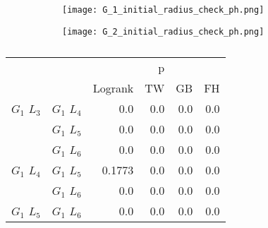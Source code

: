       \begin{figure}
        \centering      
        \begin{subfigure}[b]{0.45\textwidth}
          \texttt{[image: G\_1\_initial\_radius\_check\_ph.png]}
          \caption{}
          \label{fig:g1_branch_radius_check_ph}
        \end{subfigure}
        \hfill
        \begin{subfigure}[b]{0.45\textwidth}
          \texttt{[image: G\_2\_initial\_radius\_check\_ph.png]}
          \caption{}
          \label{fig:g2_branch_radius_check_ph}
        \end{subfigure}
        \caption{}
        \label{fig:branch_radius_check_ph}
      \end{figure}

      

      
      
      \begin{table}
        \centering
        \begin{tabular}{llrrrr}
          \toprule
                       &             &         &  p &    &     \\
          \cmidrule{3-6}
                       &             & Logrank & TW & GB & FH  \\
          \midrule
          $G_1$ $L_3$  & $G_1$ $L_4$  &  0.0 &  0.0 &  0.0 &  0.0     \\
                       & $G_1$ $L_5$  & 0.0 & 0.0 & 0.0 & 0.0    \\
                       & $G_1$ $L_6$  & 0.0 & 0.0 & 0.0 & 0.0      \\
          $G_1$ $L_4$  & $G_1$ $L_5$  & 0.1773 & 0.0 & 0.0 & 0.0      \\
                       & $G_1$ $L_6$  & 0.0 & 0.0 & 0.0 & 0.0       \\
          $G_1$ $L_5$   & $G_1$ $L_6$ & 0.0 &  0.0 & 0.0 & 0.0      \\
          \bottomrule
        \end{tabular}
        \label{tab:g1_ingroup_tests_radius}
        \caption{}
      \end{table}


